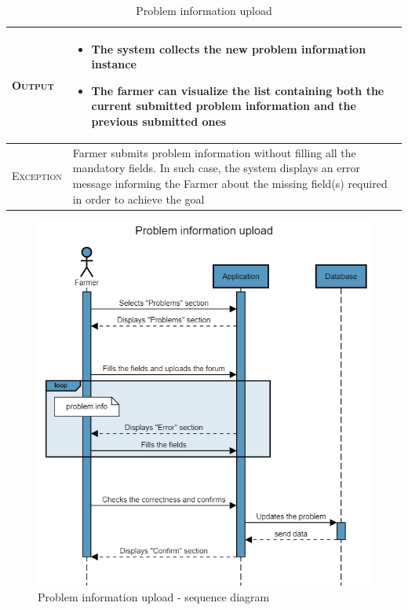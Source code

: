 \begin{table}[H]
\begin{tabular}{|l|m{}|}
    	\hline %
    	\textsc{Output}             &  \begin{itemize}
    	    \item The system collects the new problem information instance
    	    \item The farmer can visualize the list containing both the current submitted problem information and the previous submitted ones
    	\end{itemize}\\
    	\hline %
    	\textsc{Exception}         &   Farmer submits problem information without filling all the mandatory fields. In such case, the system displays an error message informing the Farmer about the missing field(s) required in order to achieve the goal\\
    	\hline %
        
    \end{tabular}

\caption{\label{tab:problem_information}Problem information upload}
\end{table}

\begin{figure}[H]
	\centering
    \includegraphics[page=1, width=\textwidth]{RASD/Images/Sequence diagrams/SW2- Problem information upload (fa).png}
	\caption{\label{fig:forum_generation_seq_diag}Problem information upload - sequence diagram}
\end{figure}

